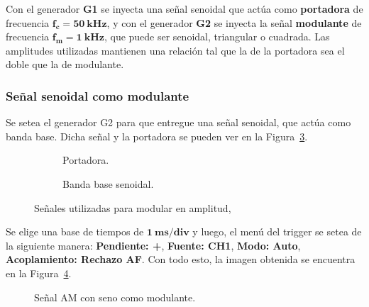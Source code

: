     Con el generador \textbf{G1} se inyecta una señal senoidal que actúa como \textbf{portadora} de frecuencia 
    $\mathbf{f_c=50~kHz}$, y con el generador \textbf{G2} se inyecta la señal \textbf{modulante} de frecuencia
    $\mathbf{f_m=1~kHz}$, que puede ser senoidal, triangular o cuadrada. Las amplitudes utilizadas mantienen 
    una relación tal que la de la portadora sea el doble que la de modulante.

    \subsubsection{Señal senoidal como modulante}
      Se setea el generador G2 para que entregue una señal senoidal, que actúa como banda base. Dicha señal
      y la portadora se pueden ver en la Figura~\ref{fig:SeñalesParaAM1}.
      
      \begin{figure}[H]
        \centering
        \begin{subfigure}[H]{0.48\textwidth}
          \caption{Portadora.}
          \label{fig:PortadoraEnTiempo}
        \end{subfigure}
        \hfill 
        \begin{subfigure}[H]{0.48\textwidth}
          \caption{Banda base senoidal.}
          \label{fig:SenoModulanteEnTiempo}
        \end{subfigure}
      
        \caption{Señales utilizadas para modular en amplitud,}
        \label{fig:SeñalesParaAM1}
      \end{figure}
        
      
      Se elige una base de tiempos de $\mathbf{1~ms/div}$ y luego, el menú del trigger se setea de la siguiente manera:
      \textbf{Pendiente: +}, \textbf{Fuente: CH1}, \textbf{Modo: Auto}, \textbf{Acoplamiento: Rechazo AF}. Con
      todo esto, la imagen obtenida se encuentra en la Figura~\ref{fig:SeñalAM1EnTiempo}.
      
      \begin{figure}[H]
        \centering
        \caption{Señal AM con seno como modulante.}
        \label{fig:SeñalAM1EnTiempo}
      \end{figure}

